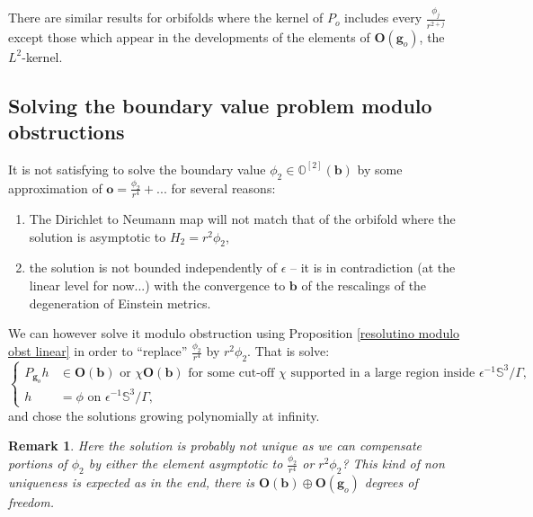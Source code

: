 \documentclass[12pt]{article}
\newtheorem{rem}[thm]{Remark}
\begin{document}
   There are similar results for orbifolds where the kernel of $P_o$ includes every $\frac{\phi_j}{r^{2+j}}$ except those which appear in the developments of the elements of $\mathbf{O}(\mathbf{g}_o)$, the $L^2$-kernel.
   
   \subsection{Solving the boundary value problem modulo obstructions}
   
   It is not satisfying to solve the boundary value $\phi_2\in \mathbb{O}^{[2]}(\mathbf{b})$ by some approximation of $\mathbf{o} = \frac{\phi_2}{r^4} +...$ for several reasons:
   \begin{enumerate}
       \item The Dirichlet to Neumann map will not match that of the orbifold where the solution is asymptotic to $H_2=r^2\phi_2$,
       \item the solution is not bounded independently of $\epsilon$ -- it is in contradiction (at the linear level for now...) with the convergence to $\mathbf{b}$ of the rescalings of the degeneration of Einstein metrics.
   \end{enumerate}
   
   We can however solve it modulo obstruction using Proposition \ref{resolutino modulo obst linear} in order to ``replace'' $\frac{\phi_2}{r^4}$ by $r^2\phi_2$. That is solve:
   \begin{equation}
       \left\{\begin{aligned}
            P_{\mathbf{g}_o} h &\in \mathbf{O}(\mathbf{b}) \text{ or } \chi\mathbf{O}(\mathbf{b}) \text{ for some cut-off } \chi \text{ supported in a large region inside } \epsilon^{-1}\mathbb{S}^3\slash\Gamma,\\
            h &= \phi \text{ on } \epsilon^{-1}\mathbb{S}^3\slash\Gamma,
       \end{aligned}\right.\label{boundary orb obst}
   \end{equation}
   and chose the solutions growing polynomially at infinity.
   \begin{rem}
    Here the solution is probably not unique as we can compensate portions of $\phi_2$ by either the element asymptotic to $\frac{\phi_2}{r^4}$ or $r^2\phi_2$? This kind of non uniqueness is expected as in the end, there is $\mathbf{O}(\mathbf{b})\oplus \mathbf{O}(\mathbf{g}_o)$ degrees of freedom.
   \end{rem}
   
\end{document}

